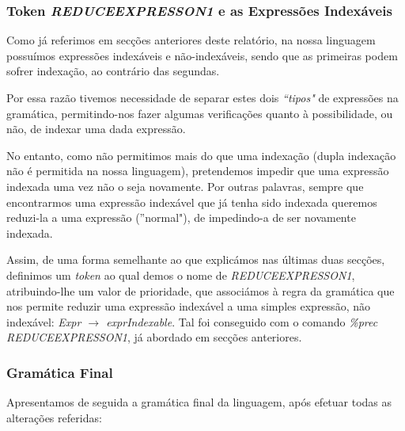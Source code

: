\documentclass[11pt,a4paper]{article}
\begin{document}
\subsubsection{Token \emph{REDUCEEXPRESSON1} e as Expressões Indexáveis}

Como já referimos em secções anteriores deste relatório, na nossa linguagem possuímos expressões indexáveis e não-indexáveis, sendo que as primeiras podem sofrer indexação, ao contrário das segundas.

Por essa razão tivemos necessidade de separar estes dois \emph{``tipos"} de expressões na gramática, permitindo-nos fazer algumas verificações quanto à possibilidade, ou não, de indexar uma dada expressão.

No entanto, como não permitimos mais do que uma indexação (dupla indexação não é permitida na nossa linguagem), pretendemos impedir que uma expressão indexada uma vez não o seja novamente. Por outras palavras, sempre que encontrarmos uma expressão indexável que já tenha sido indexada queremos reduzi-la a uma expressão (''normal"), de impedindo-a de ser novamente indexada.

Assim, de uma forma semelhante ao que explicámos nas últimas duas secções, definimos um \emph{token} ao qual demos o nome de \emph{REDUCEEXPRESSON1}, atribuindo-lhe um valor de prioridade, que associámos à regra da gramática que nos permite reduzir uma expressão indexável a uma simples expressão, não indexável: \emph{Expr $\rightarrow$ exprIndexable}. Tal foi conseguido com o comando \emph{\%prec REDUCEEXPRESSON1}, já abordado em secções anteriores.

\subsubsection{Gramática Final}

Apresentamos de seguida a gramática final da linguagem, após efetuar todas as alterações referidas:
\end{document}
